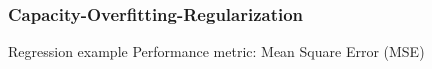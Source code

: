 \begin{frame}
\frametitle{Capacity-Overfitting-Regularization}


\begin{block}{Regression example}
Performance metric: Mean Square Error (MSE)
\begin{columns}
\begin{column}{.5\textwidth}
\end{column}
\end{columns}
\end{block}
\end{frame}
